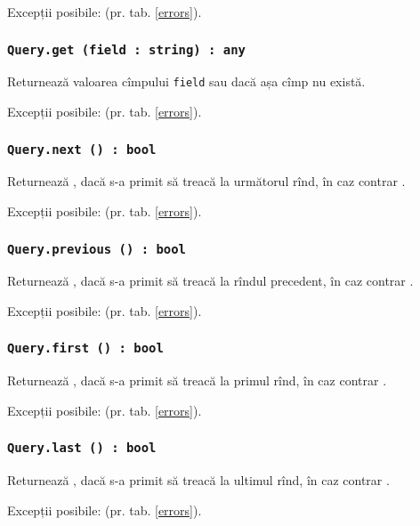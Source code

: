 Excepții posibile:  (pr. tab. \ref{errors}).

\subsubsection{\texttt{Query.get (field : string) : any}}

Returnează valoarea cîmpului \texttt{field} sau \void{} dacă așa cîmp nu există.

Excepții posibile:  (pr. tab. \ref{errors}).

\subsubsection{\texttt{Query.next () : bool}}

Returnează \true, dacă s-a primit să treacă la următorul rînd, în caz contrar \false.

Excepții posibile:  (pr. tab. \ref{errors}).

\subsubsection{\texttt{Query.previous () : bool}}

Returnează \true, dacă s-a primit să treacă la rîndul precedent, în caz contrar \false.

Excepții posibile:  (pr. tab. \ref{errors}).

\subsubsection{\texttt{Query.first () : bool}}

Returnează \true, dacă s-a primit să treacă la primul rînd, în caz contrar \false.

Excepții posibile:  (pr. tab. \ref{errors}).

\subsubsection{\texttt{Query.last () : bool}}

Returnează \true, dacă s-a primit să treacă la ultimul rînd, în caz contrar \false.

Excepții posibile:  (pr. tab. \ref{errors}).

